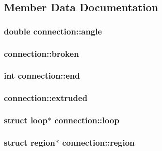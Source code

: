 \subsection{Member Data Documentation}
\hypertarget{structconnection_a33fe62e9106d0de72fdffd1afa080257}{
\subsubsection[{angle}]{\setlength{\rightskip}{0pt plus 5cm}double connection\+::angle}}\label{structconnection_a33fe62e9106d0de72fdffd1afa080257}
\hypertarget{structconnection_a699addda10bad7552532d4f38aa00f1e}{
\subsubsection[{broken}]{ connection\+::broken}}\label{structconnection_a699addda10bad7552532d4f38aa00f1e}
\hypertarget{structconnection_a2eb3c7c7ea26ea070cd24284cb13baca}{
\subsubsection[{end}]{\setlength{\rightskip}{0pt plus 5cm}int connection\+::end}}\label{structconnection_a2eb3c7c7ea26ea070cd24284cb13baca}
\hypertarget{structconnection_ad108aaca045b991c8d6be924ada68fda}{
\subsubsection[{extruded}]{ connection\+::extruded}}\label{structconnection_ad108aaca045b991c8d6be924ada68fda}
\hypertarget{structconnection_abcf2970e1b12e7ea857edae5790fadbb}{
\subsubsection[{loop}]{\setlength{\rightskip}{0pt plus 5cm}struct {\bf loop}$\ast$ connection\+::loop}}\label{structconnection_abcf2970e1b12e7ea857edae5790fadbb}
\hypertarget{structconnection_a571d9b8fe86ebe537ad0b5e052bdc70a}{
\subsubsection[{region}]{\setlength{\rightskip}{0pt plus 5cm}struct {\bf region}$\ast$ connection\+::region}}\label{structconnection_a571d9b8fe86ebe537ad0b5e052bdc70a}
